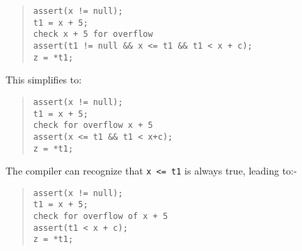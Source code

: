\begin{quote}
\begin{verbatim}
assert(x != null);
t1 = x + 5;
check x + 5 for overflow
assert(t1 != null && x <= t1 && t1 < x + c);
z = *t1;
\end{verbatim}
\end{quote}

This simplifies to:

\begin{quote}
\begin{verbatim}
assert(x != null);
t1 = x + 5;
check for overflow x + 5
assert(x <= t1 && t1 < x+c);
z = *t1;
\end{verbatim}
\end{quote}

The compiler can recognize that \texttt{x <= t1} is always true,
leading to:-

\begin{quote}
\begin{verbatim}
assert(x != null);
t1 = x + 5;
check for overflow of x + 5
assert(t1 < x + c);
z = *t1;
\end{verbatim}
\end{quote}